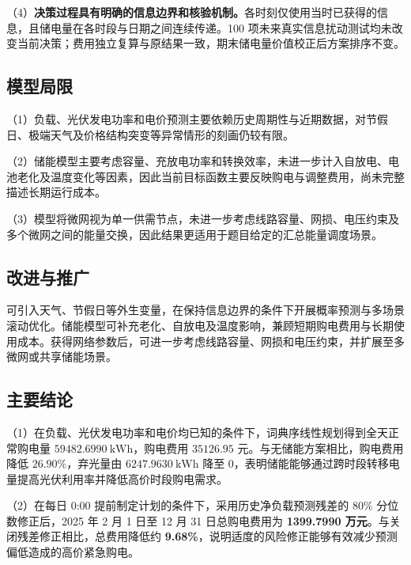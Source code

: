 \documentclass[12pt,a4paper]{ctexart}
\renewcommand{\textbf}[1]{{\CJKfamily{heiti}\bfseries #1}}
\begin{document}
\par\noindent\hspace*{2em}（4）\textbf{决策过程具有明确的信息边界和核验机制。}各时刻仅使用当时已获得的信息，且储电量在各时段与日期之间连续传递。100 项未来真实信息扰动测试均未改变当前决策；费用独立复算与原结果一致，期末储电量价值校正后方案排序不变。
\subsection{模型局限}
\par\noindent\hspace*{2em}（1）负载、光伏发电功率和电价预测主要依赖历史周期性与近期数据，对节假日、极端天气及价格结构突变等异常情形的刻画仍较有限。

\par\noindent\hspace*{2em}（2）储能模型主要考虑容量、充放电功率和转换效率，未进一步计入自放电、电池老化及温度变化等因素，因此当前目标函数主要反映购电与调整费用，尚未完整描述长期运行成本。

\par\noindent\hspace*{2em}（3）模型将微网视为单一供需节点，未进一步考虑线路容量、网损、电压约束及多个微网之间的能量交换，因此结果更适用于题目给定的汇总能量调度场景。
\subsection{改进与推广}
\par\noindent\hspace*{2em}可引入天气、节假日等外生变量，在保持信息边界的条件下开展概率预测与多场景滚动优化。储能模型可补充老化、自放电及温度影响，兼顾短期购电费用与长期使用成本。获得网络参数后，可进一步考虑线路容量、网损和电压约束，并扩展至多微网或共享储能场景。

\subsection{主要结论}
\par\noindent\hspace*{2em}（1）在负载、光伏发电功率和电价均已知的条件下，词典序线性规划得到全天正常购电量 $59482.6990\ \mathrm{kWh}$，购电费用 $35126.95$ 元。与无储能方案相比，购电费用降低 $26.90\%$，弃光量由 $6247.9630\ \mathrm{kWh}$ 降至 0，表明储能能够通过跨时段转移电量提高光伏利用率并降低高价时段购电需求。

\par\noindent\hspace*{2em}（2）在每日 0:00 提前制定计划的条件下，采用历史净负载预测残差的 $80\%$ 分位数修正后，2025 年 2 月 1 日至 12 月 31 日总购电费用为 \textbf{1399.7990 万元}。与关闭残差修正相比，总费用降低约 \textbf{9.68\%}，说明适度的风险修正能够有效减少预测偏低造成的高价紧急购电。
\end{document}

